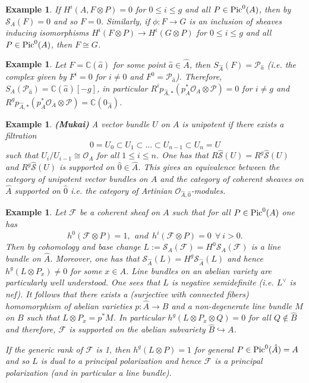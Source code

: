 \documentclass[10pt]{amsart}
\newtheorem{ex}[thm]{Example}
\newcommand\Pic{{\text{\rm Pic}}}
\newcommand\lra{\longrightarrow}
\newcommand\ot{{\otimes}}
\newcommand\OO{{\mathcal{O}}}
\newcommand\LL{{\mathcal{P}}}
\newcommand\FF{{\mathcal{F}}}
\newcommand\CC{{\mathbb{C}}}
\newcommand\sh{{\hat {\mathcal S}}}
\newcommand\s{{ {\mathcal S}}}
\begin{document}
\begin{ex}\label{E1} If 
$H^i(A,F\ot P)=0$ for $0\leq i \leq g$ and all $P\in \Pic ^0(A)$,
then by $\s _A(F)=0$ and so $F=0$. 
Similarly, if $\phi :F\lra G$ is an inclusion of sheaves
inducing isomorphisms $H^i(F\ot P)\lra H^i(G\ot P)$ for $0\leq i \leq g$ 
and all $P\in \Pic ^0(A)$, then $F\cong G$.
\end{ex}
\begin{ex}\label{E2} Let $F=\CC (\hat {a})$ for some point $\hat{a}\in 
\hat{A}$, then $S_{\hat{A}}(F)=\LL _{\hat {a}}$ (i.e. the complex
given by $F^i=0$ for $i\ne 0$ and $F^0=\LL _{\hat {a}}$).
Therefore, $S_A(\LL _{\hat {a}})=\CC (\hat {a})[-g]$, in particular
$R^ip_{\hat{A},*}(p_A^* \OO _A \ot \LL)=0$ for $i\ne g$ and
$R^gp_{\hat{A},*}(p_A^* \OO _A \ot \LL)=\CC (0_{\hat{A}})$. 
\end{ex}


 \begin{ex} \label {exM} {\bf (Mukai)}
 A vector bundle $U$ on $A$ is unipotent if there exists a filtration
 $$0=U_0\subset U_1\subset ...\subset U_{n-1}\subset U_n=U$$
 such that $U_i/U_{i-1}\cong \OO _A$ for all $1\leq i\leq n$. One has that
 $R\sh (U)=R^g\sh (U)$ and $R^g\sh (U)$ is supported on
 $\hat {0}\in \hat{A}$. This gives an equivalence between the category of
 unipotent vector bundles on $A$ and the category of coherent sheaves on
 $\hat {A}$ supported on $\hat{0}$ i.e. the category of Artinian $\OO 
 _{\hat{A},\hat{0}}$-modules.
 \end{ex}
\begin{ex} \label{Ex4}
Let $\FF$ be a coherent sheaf on $A$ such that for all $P\in
\Pic ^0(A)$ one has
$$h^0(\FF \ot P)=1,\ \ and\ \ h^i(\FF \ot P)=0\ \ \forall\ i>0.$$
Then by cohomology and base change $L:= \s _A (\FF )=H^0
\s _A (\FF )$ is a line bundle on $\hat {A}$.
Moreover, one has that $\s _{\hat{A}}(L)=H^g\s _{\hat {A}} (L)$ and
hence $h^g(L\ot P_x)\ne 0$ for some $x\in A$. 
Line bundles on an abelian variety are particularly well understood.
One sees that $L$
is negative semidefinite (i.e. $L^\vee$ is nef). 
It follows that there exists a (surjective with connected fibers)
homomorphism of abelian varieties $p:\hat{A}\lra B$
and a non-degenerate line bundle $M$ on $B$ such that $L\ot P_x=p^*M$.
In particular $h^g(L\ot P_x \ot Q)=0$ for all $Q\notin \hat {B}$
and therefore, $\FF$ is supported on the abelian subvariety $\hat{B}
\hookrightarrow A$.

If the generic rank of $\FF$ is 1, then $h^g(L \ot P)=1$ for general
$P\in \Pic ^0(\hat{A})=A$ and so $L$ is dual to a principal polarization
and hence $\FF$ is a principal polarization (and in particular
a line bundle).

\end{ex}
\end{document}
